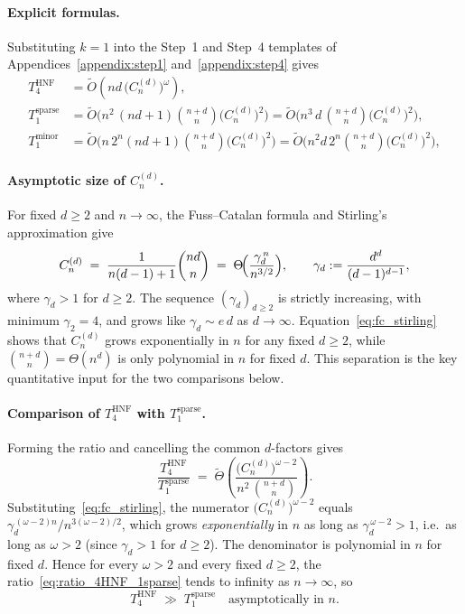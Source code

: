 \paragraph{Explicit formulas.}
Substituting $k=1$ into the Step~1 and Step~4 templates of Appendices~\ref{appendix:step1} and~\ref{appendix:step4} gives
\begin{align}
	T_{4}^{\mathrm{HNF}}
	&= \widetilde{O}\!\left(nd\,\bigl(C_n^{(d)}\bigr)^\omega\right),
	\label{eq:wellsq_T4HNF}\\[0.3em]
	T_{1}^{\mathrm{sparse}}
	&= \widetilde{O}\!\bigl(n^2\,(nd+1)\binom{n+d}{n}\bigl(C_n^{(d)}\bigr)^2\bigr)
	= \widetilde{O}\!\bigl(n^3\,d\,\binom{n+d}{n}\bigl(C_n^{(d)}\bigr)^2\bigr),
	\label{eq:wellsq_T1sparse}\\[0.3em]
	T_{1}^{\mathrm{minor}}
	&= \widetilde{O}\!\bigl(n\,2^n(nd+1)\binom{n+d}{n}\bigl(C_n^{(d)}\bigr)^2\bigr)
	= \widetilde{O}\!\bigl(n^2 d\,2^n\binom{n+d}{n}\bigl(C_n^{(d)}\bigr)^2\bigr),
	\label{eq:wellsq_T1minor}
\end{align}
\paragraph{Asymptotic size of $C_n^{(d)}$.}
For fixed $d\ge 2$ and $n\to\infty$, the Fuss--Catalan formula and Stirling's approximation give
\begin{equation}\label{eq:fc_stirling}
	C_n^{(d)} \;=\; \frac{1}{n(d-1)+1}\binom{nd}{n}
	\;=\; \Theta\!\Bigl(\frac{\gamma_d^{\,n}}{n^{3/2}}\Bigr),
	\qquad
	\gamma_d := \frac{d^d}{(d-1)^{d-1}},
\end{equation}
where $\gamma_d>1$ for $d\ge 2$. The sequence $(\gamma_d)_{d\ge 2}$ is strictly increasing, with minimum $\gamma_2=4$, and grows like $\gamma_d\sim e\,d$ as $d\to\infty$. Equation~\eqref{eq:fc_stirling} shows that $C_n^{(d)}$ grows exponentially in $n$ for any fixed $d\ge 2$, while $\binom{n+d}{n}=\Theta(n^d)$ is only polynomial in $n$ for fixed $d$. This separation is the key quantitative input for the two comparisons below.

\paragraph{Comparison of $T_{4}^{\mathrm{HNF}}$ with $T_{1}^{\mathrm{sparse}}$.}
Forming the ratio and cancelling the common $d$-factors gives
\begin{equation}\label{eq:ratio_4HNF_1sparse}
	\frac{T_{4}^{\mathrm{HNF}}}{T_{1}^{\mathrm{sparse}}}
	\;=\; \widetilde{\Theta}\!\left(
	\frac{\bigl(C_n^{(d)}\bigr)^{\omega-2}}{n^2\,\binom{n+d}{n}}
	\right).
\end{equation}
Substituting~\eqref{eq:fc_stirling}, the numerator $\bigl(C_n^{(d)}\bigr)^{\omega-2}$ equals $\gamma_d^{\,(\omega-2)n}/n^{3(\omega-2)/2}$, which grows \emph{exponentially} in $n$ as long as $\gamma_d^{\,\omega-2}>1$, i.e.\ as long as $\omega>2$ (since $\gamma_d>1$ for $d\ge 2$). The denominator is polynomial in $n$ for fixed $d$. Hence for every $\omega>2$ and every fixed $d\ge 2$, the ratio~\eqref{eq:ratio_4HNF_1sparse} tends to infinity as $n\to\infty$, so
\[
T_{4}^{\mathrm{HNF}} \;\gg\; T_{1}^{\mathrm{sparse}}\quad\text{asymptotically in }n.
\]

